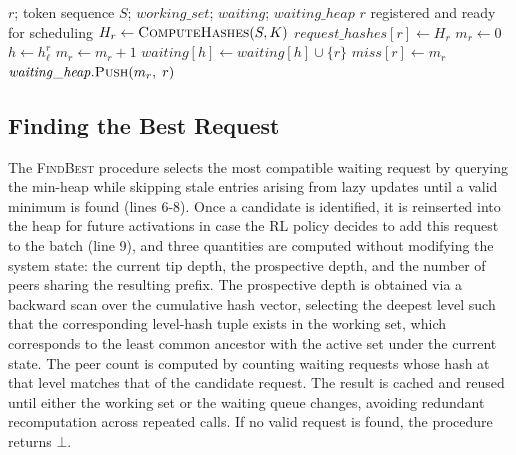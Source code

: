 \begin{algorithm}[t]
\caption{\textsc{Insert}(r, S)}
\label{alg:insert}
\begin{algorithmic}[1]
\Require $r$; token sequence $S$; $\mathit{working\_set}$; $\mathit{waiting}$; $\mathit{waiting\_heap}$
\Ensure $r$ registered and ready for scheduling
\State $H_r \gets \textsc{ComputeHashes}(S, K)$
\State $\mathit{request\_hashes}[r] \gets H_r$
\State $m_r \gets 0$
  \State $h \gets h_\ell^r$
    \State $m_r \gets m_r + 1$
  \EndIf
  \State $\mathit{waiting}[h] \gets \mathit{waiting}[h] \cup \{r\}$
\EndFor
\State $\mathit{miss}[r] \gets m_r$
\State $\mathit{waiting\_heap}.\textsc{Push}(m_r,\; r)$
\end{algorithmic}
\end{algorithm}

\subsection{Finding the Best Request}
The \textsc{FindBest} procedure selects the most compatible waiting request by querying the min-heap while skipping stale entries arising from lazy updates until a valid minimum is found (lines 6-8). Once a candidate is identified, it is reinserted into the heap for future activations in case the RL policy decides to add this request to the batch (line 9), and three quantities are computed without modifying the system state: the current tip depth, the prospective depth, and the number of peers sharing the resulting prefix. The prospective depth is obtained via a backward scan over the cumulative hash vector, selecting the deepest level such that the corresponding level-hash tuple exists in the working set, which corresponds to the least common ancestor with the active set under the current state. The peer count is computed by counting waiting requests whose hash at that level matches that of the candidate request. The result is cached and reused until either the working set or the waiting queue changes, avoiding redundant recomputation across repeated calls. If no valid request is found, the procedure returns $\bot$.


